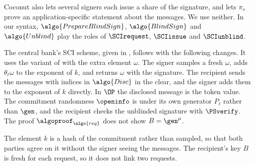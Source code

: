 Coconut also lets several signers each issue a share of the signature, and lets
$\pi_s$ prove an application-specific statement about the messages. We use
neither. In our syntax, $\algo{PrepareBlindSign}$, $\algo{BlindSign}$ and
$\algo{Unblind}$ play the roles of $\SCIrequest$, $\SCIissue$ and
$\SCIunblind$.

The central bank's SCI scheme, given in , follows
 with the following changes. It uses the variant of
 with the extra element $\omega$. The signer samples a fresh
$\omega$, adds $\theta_\ell \omega$ to the exponent of $k$, and returns $\omega$
with the signature. The recipient sends
the messages with indices in $\algo{Disc}$ in the clear, and the signer adds
them to the exponent of $k$ directly. In $\OP$ the disclosed message
is the token value. The commitment randomness $\openinfo$ is under its own
generator $P_\ell$ rather than $\gen$, and the recipient checks the unblinded
signature with $\PSverify$. The proof $\algoproof_{\algo{req}}$ does not show
$B = \gen^{\mu}$.

The element $k$ is a hash of the commitment rather than sampled, so that both
parties agree on it without the signer seeing the messages. The recipient's key
$B$ is fresh for each request, so it does not link two requests.

